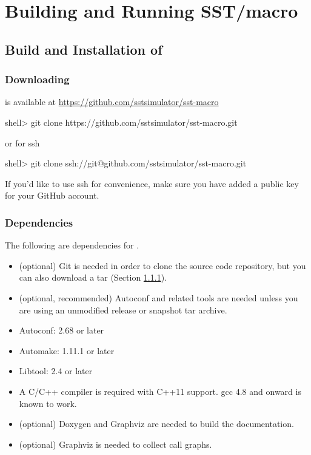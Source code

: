 
\chapter{Building and Running SST/macro}
\label{chapter:building}

\section{Build and Installation of \sstmacro}
\label{sec:buildinstall}


\subsection{Downloading}
\label{subsec:build:downloading}

\sstmacro is available at \url{https://github.com/sstsimulator/sst-macro}

\begin{ShellCmd}
shell> git clone https://github.com/sstsimulator/sst-macro.git 
\end{ShellCmd}
or for ssh

\begin{ShellCmd}
shell> git clone ssh://git@github.com/sstsimulator/sst-macro.git 
\end{ShellCmd}


If you'd like to use ssh for convenience, make sure you have added a public key for your GitHub account.

\subsection{Dependencies}
\label{subsec:build:dependencies}

The following are dependencies for \sstmacro.

\begin{itemize}
\item (optional) Git is needed in order to clone the source code repository, but you can also download a tar (Section \ref{subsec:build:downloading}).
\item (optional, recommended) Autoconf and related tools are needed unless you are using an unmodified release or snapshot tar archive.
\item Autoconf: 2.68 or later 
\item Automake: 1.11.1 or later 
\item Libtool: 2.4 or later 
\item A C/C++ compiler is required with C++11 support.  gcc 4.8 and onward is known to work. 
\item (optional) Doxygen and Graphviz are needed to build the documentation.
\item (optional) Graphviz is needed to collect call graphs.
\end{itemize}

